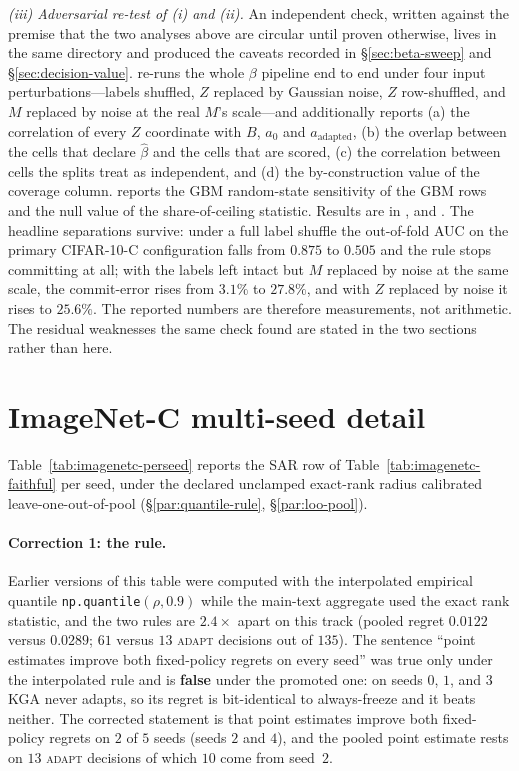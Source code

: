 \emph{(iii) Adversarial re-test of (i) and (ii).} An independent check, written against the premise
that the two analyses above are circular until proven otherwise, lives in the same directory and
produced the caveats recorded in \S\ref{sec:beta-sweep} and \S\ref{sec:decision-value}.
 re-runs the whole $\beta$ pipeline end to end under four input
perturbations---labels shuffled, $Z$ replaced by Gaussian noise, $Z$ row-shuffled, and $M$ replaced
by noise at the real $M$'s scale---and additionally reports (a) the correlation of every $Z$
coordinate with $B$, $a_0$ and $a_{\text{adapted}}$, (b) the overlap between the cells that declare
$\widehat\beta$ and the cells that are scored, (c) the correlation between cells the splits treat as
independent, and (d) the by-construction value of the coverage column.
 reports the GBM random-state sensitivity of the GBM rows and
the null value of the share-of-ceiling statistic. Results are in
,  and
. The headline separations survive: under a full label
shuffle the out-of-fold AUC on the primary CIFAR-10-C configuration falls from $0.875$ to $0.505$
and the rule stops committing at all; with the labels left intact but $M$ replaced by noise at the
same scale, the commit-error rises from $3.1\%$ to $27.8\%$, and with $Z$ replaced by noise it rises
to $25.6\%$. The reported numbers are therefore measurements, not arithmetic. The residual
weaknesses the same check found are stated in the two sections rather than here.

\section{ImageNet-C multi-seed detail}\label{app:imagenetc-ms}
Table~\ref{tab:imagenetc-perseed} reports the SAR row of Table~\ref{tab:imagenetc-faithful} per
seed, under the declared unclamped exact-rank radius calibrated leave-one-out-of-pool
(\S\ref{par:quantile-rule}, \S\ref{par:loo-pool}).

\paragraph{Correction 1: the rule.} Earlier versions of this table were computed with the
interpolated empirical quantile \texttt{np.quantile}$(\rho,0.9)$ while the main-text aggregate used
the exact rank statistic, and the two rules are $2.4\times$ apart on this track (pooled regret
$0.0122$ versus $0.0289$; $61$ versus $13$ \textsc{adapt} decisions out of $135$). The sentence
``point estimates improve both fixed-policy regrets on every seed'' was true only under the
interpolated rule and is \textbf{false} under the promoted one: on seeds $0$, $1$, and $3$
\textsc{KGA} never adapts, so its regret is bit-identical to always-freeze and it beats neither. The
corrected statement is that point estimates improve both fixed-policy regrets on $2$ of $5$ seeds
(seeds $2$ and $4$), and the pooled point estimate rests on $13$ \textsc{adapt} decisions of which
$10$ come from seed~$2$.

